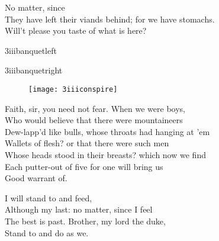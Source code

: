 

\begin{verse_speech}[Sebastian] 
No matter, since\\
They have left their viands behind; for we have stomachs.\\
Will't please you taste of what is here?
\end{verse_speech}

\begin{a4}
	\begin{bwbigpic}
		[\picwidth]
		{3iiibanquetleft}
		{}
	\end{bwbigpic}
	\begin{bwbigpic}
		[\picwidth]
		{3iiibanquetright}
		{}
	\end{bwbigpic}

\end{a4}


\begin{letter}
	\begin{figure}[tb]
		\centering
		\texttt{[image: 3iiiconspire]}
	\end{figure}
\end{letter}

\begin{verse_speech}[Gonzalo] 
Faith, sir, you need not fear. When we were boys,\\
Who would believe that there were mountaineers\\
Dew-lapp'd like bulls, whose throats had hanging at 'em\\
Wallets of flesh? or that there were such men\\
Whose heads stood in their breasts? which now we find\\
Each putter-out of five for one will bring us\\
Good warrant of.
\end{verse_speech}

\begin{verse_speech}[Alonso] 
I will stand to and feed,\\
Although my last: no matter, since I feel\\
The best is past. Brother, my lord the duke,\\
Stand to and do as we.
\end{verse_speech}

